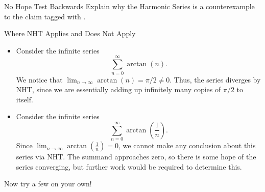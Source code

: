 \begin{exercise}{No Hope Test Backwards \Coffeecup}
Explain why the Harmonic Series is a counterexample to the claim tagged with \Frowny.  
\end{exercise}

\begin{example}{Where NHT Applies and Does Not Apply}
\begin{itemize}
\item Consider the infinite series $$ \sum_{n=0}^\infty \arctan(n). $$  We notice that $\lim_{n\to \infty}\arctan(n)=\pi/2\neq 0$.  Thus, the series diverges by NHT, since we are essentially adding up infinitely many copies of $\pi/2$ to itself.
\item Consider the infinite series $$ \sum_{n=0}^\infty \arctan\left(\frac{1}{n}\right).$$  Since $\lim_{n\to \infty}\arctan\left(\frac{1}{n}\right)=0$, we cannot make any conclusion about this series via NHT.  The summand approaches zero, so there is some hope of the series converging, but further work would be required to determine this.
\end{itemize}
\end{example}
Now try a few on your own!

